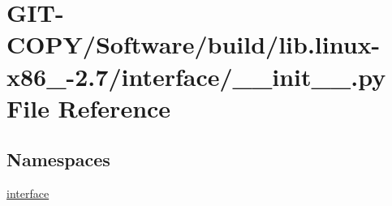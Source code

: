 \hypertarget{GIT-COPY_2Software_2build_2lib_8linux-x86__64-2_87_2interface_2____init_____8py}{}\section{G\+I\+T-\/\+C\+O\+P\+Y/\+Software/build/lib.linux-\/x86\+\_-\/2.7/interface/\+\_\+\+\_\+init\+\_\+\+\_\+.py File Reference}
\label{GIT-COPY_2Software_2build_2lib_8linux-x86__64-2_87_2interface_2____init_____8py}
\subsection*{Namespaces}
\begin{DoxyCompactItemize}
\item 
 \hyperlink{namespaceinterface}{interface}
\end{DoxyCompactItemize}
